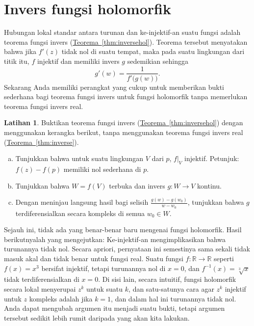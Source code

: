 \documentclass[12pt,openany]{book}
\newcommand{\R}{{\mathbb{R}}}
\theoremstyle{plain}
\theoremstyle{remark}
\theoremstyle{definition}
\newenvironment{exbox}{%
    \def\FrameCommand{\vrule width 1pt \relax\hspace{10pt}}%
    \MakeFramed{\advance\hsize-\width\FrameRestore}%
}{%
    \endMakeFramed
}
\newenvironment{exparts}{%
    \leavevmode\begin{enumerate}[a),noitemsep,topsep=0pt,parsep=0pt,partopsep=0pt]
}{%
    \end{enumerate}
}
\theoremstyle{exercise}
\newtheorem{exercise}{Latihan}[section]
\theoremstyle{example}
\newcommand{\thmref}[1]{\hyperref[#1]{Teorema~\ref*{#1}}}
\begin{document}
\section{Invers fungsi holomorfik} \label{sec:inverses}

Hubungan lokal standar antara turunan dan ke-injektif-an suatu
fungsi adalah teorema fungsi invers (\thmref{thm:inversehol}).
Teorema tersebut menyatakan bahwa jika $f'(z)$ tidak nol di suatu tempat, maka pada suatu
lingkungan dari titik itu, $f$ injektif dan memiliki invers $g$ sedemikian sehingga
\begin{equation*}
g'(w) = \frac{1}{f'\bigl(g(w)\bigr)} .
\end{equation*}
Sekarang Anda memiliki perangkat yang cukup untuk memberikan bukti sederhana
bagi teorema fungsi invers untuk fungsi holomorfik
tanpa memerlukan teorema fungsi invers real.

\begin{exbox}
\begin{exercise}
Buktikan teorema fungsi invers (\thmref{thm:inversehol})
dengan menggunakan kerangka berikut, tanpa menggunakan teorema fungsi invers
real (\thmref{thm:inverse}).
\begin{exparts}
\item Tunjukkan bahwa untuk suatu lingkungan $V$ dari $p$, $f|_V$ injektif.
Petunjuk: $f(z)-f(p)$ memiliki nol sederhana di $p$.
\item Tunjukkan bahwa $W = f(V)$ terbuka dan invers $g \colon W \to V$
kontinu.
\item Dengan meninjau langsung hasil bagi selisih
$\frac{g(w)-g(w_0)}{w-w_0}$,
tunjukkan bahwa $g$ terdiferensialkan secara kompleks di semua $w_0 \in W$.
\end{exparts}
\end{exercise}
\end{exbox}

Sejauh ini, tidak ada yang benar-benar baru mengenai fungsi holomorfik.
Hasil berikutnyalah
yang mengejutkan: Ke-injektif-an
mengimplikasikan bahwa turunannya tidak nol.
Secara apriori, pernyataan ini semestinya sama sekali tidak masuk akal dan tidak benar untuk fungsi real.
Suatu fungsi $f \colon \R \to \R$ seperti $f(x) = x^3$
bersifat injektif, tetapi turunannya nol di $x=0$, dan $f^{-1}(x) =
\sqrt[3]{x}$ tidak terdiferensialkan di $x=0$.
Di sisi lain, secara intuitif, fungsi holomorfik
secara lokal menyerupai $z^k$ untuk suatu $k$, dan satu-satunya cara agar $z^k$ injektif
untuk $z$ kompleks adalah
jika $k=1$, dan dalam hal ini turunannya tidak nol.
Anda dapat mengubah
argumen itu menjadi suatu bukti, tetapi argumen tersebut sedikit lebih rumit daripada yang akan kita lakukan.
\end{document}
